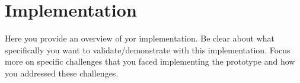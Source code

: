 \section{\mbox{Implementation}}\label{sec:implementation} 
Here you provide an overview of yor implementation. Be clear about what specifically you want to validate/demonstrate with this implementation. Focus more on specific challenges that you faced implementing the prototype and how you addressed these challenges. 